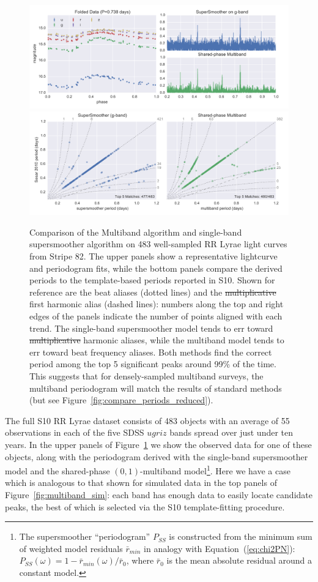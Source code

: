 \documentclass{emulateapj}
\newcommand{\Fig}[1]{Figure~\ref{fig:#1}}
\newcommand{\fig}[1]{\Fig{#1}}
\newcommand{\figlabel}[1]{\label{fig:#1}}
\newcommand{\Eq}[1]{Equation~(\ref{eq:#1})}
\newcommand{\eq}[1]{\Eq{#1}}
\newcommand{\new}[1]{{\color{red} #1}}
\newcommand{\old}[1]{{\sout{#1}}}
\begin{document}
\begin{figure}
  \centering
  \includegraphics[width=\textwidth]{fig07a.pdf}
  \includegraphics[width=\textwidth]{fig07b.pdf}
  \caption{
    Comparison of the Multiband algorithm and single-band supersmoother algorithm on 483 well-sampled RR Lyrae light curves from Stripe 82.
    The upper panels show a representative lightcurve and periodogram fits, while the bottom panels compare the derived periods to the template-based periods reported in S10.
    Shown for reference are the beat aliases (dotted lines) and the \old{multiplicative} \new{first harmonic} alias (dashed lines): numbers along the top and right edges of the panels indicate the number of points aligned with each trend.
    The single-band supersmoother model tends to err toward \old{multiplicative} \new{harmonic} aliases, while the multiband model tends to err toward beat frequency aliases.
    Both methods find the correct period among the top 5 significant peaks around 99\% of the time.
    \new{This suggests that for densely-sampled multiband surveys, the multiband periodogram will match the results of standard methods (but see \fig{compare_periods_reduced}).}
  } 
  \figlabel{compare_periods}
\end{figure}

The full S10 RR Lyrae dataset consists of 483 objects with an average of 55 observations in each of the five SDSS $ugriz$ bands spread over just under ten years.  In the upper panels of \fig{compare_periods} we show the observed data for one of these objects, along with the periodogram derived with the single-band supersmoother model and the shared-phase $(0, 1)$-multiband model\footnote{The supersmoother ``periodogram'' $P_{SS}$ is constructed from the minimum sum of weighted model residuals $\bar{r}_{min}$ in analogy with \eq{chi2PN}: $P_{SS}(\omega) = 1 - \bar{r}_{min}(\omega) / \bar{r}_0$, where $\bar{r}_0$ is the mean absolute residual around a constant model.}. Here we have a case which is analogous to that shown for simulated data in the top panels of \fig{multiband_sim}: each band has enough data to easily locate candidate peaks, the best of which is selected via the S10 template-fitting procedure.
\end{document}
